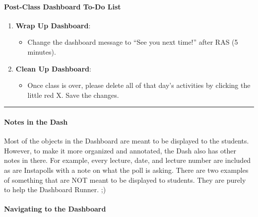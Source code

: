 \documentclass[
]{article}
\providecommand{\tightlist}{%
  \setlength{\itemsep}{0pt}\setlength{\parskip}{0pt}}
\begin{document}
\hypertarget{post-class-dashboard-to-do-list}{%
\paragraph{Post-Class Dashboard To-Do List}\label{post-class-dashboard-to-do-list}}

\begin{enumerate}
\def\labelenumi{\arabic{enumi}.}
\tightlist
\item
  \textbf{Wrap Up Dashboard}:

  \begin{itemize}
  \tightlist
  \item
    Change the dashboard message to ``See you next time!'' after RAS (5 minutes).\\
  \end{itemize}
\item
  \textbf{Clean Up Dashboard}:

  \begin{itemize}
  \tightlist
  \item
    Once class is over, please delete all of that day's activities by clicking the little red X. Save the changes.
  \end{itemize}
\end{enumerate}

\begin{center}\rule{0.5\linewidth}{0.5pt}\end{center}

\hypertarget{notes-in-the-dash}{%
\paragraph{Notes in the Dash}\label{notes-in-the-dash}}

Most of the objects in the Dashboard are meant to be displayed to the students. However, to make it more organized and annotated, the Dash also has other notes in there. For example, every lecture, date, and lecture number are included as are Instapolls with a note on what the poll is asking. There are two examples of something that are NOT meant to be displayed to students. They are purely to help the Dashboard Runner. ;)

\hypertarget{navigating-to-the-dashboard}{%
\paragraph{Navigating to the Dashboard}\label{navigating-to-the-dashboard}}
\end{document}
